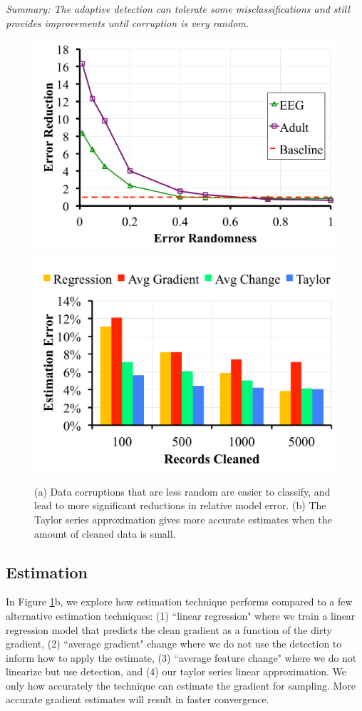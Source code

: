 \noindent \emph{Summary: The adaptive detection can tolerate some misclassifications and still provides improvements until corruption is very random. }

\begin{figure}[ht!]
\vspace{-1em}
\centering
 \includegraphics[width=0.49\columnwidth]{exp/exp5a.pdf}
 \includegraphics[width=0.49\columnwidth]{exp/exp12.pdf}
 \caption{(a) Data corruptions that are less random are easier to classify, and lead to more significant reductions in relative model error. (b) The Taylor series approximation gives more accurate estimates when the amount of cleaned data is small. \label{tradeoffs2}}
\end{figure}

\subsection{Estimation}\label{est}
In Figure \ref{tradeoffs2}b, we explore how estimation technique performs compared to a few alternative estimation techniques: (1) ``linear regression" where we train a linear regression model that predicts the clean gradient as a function of the dirty gradient, (2) ``average gradient" change where we do not use the detection to inform how to apply the estimate, (3) ``average feature change" where we do not linearize but use detection, and (4) our taylor series linear approximation.
We only how accurately the technique can estimate the gradient for sampling.
More accurate gradient estimates will result in faster convergence.

